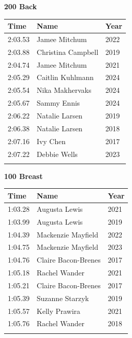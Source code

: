 \vspace{1.2em}
\noindent\begin{minipage}[t]{0.48\textwidth}
\centering
\textbf{\textcolor{teamprimary}{200 Back}}\par
\vspace{0.5em}
\centering
\small
\renewcommand{\arraystretch}{1.0}
\setlength{\tabcolsep}{4pt}
\begin{tabular}{@{}p{1.8cm}p{3.0cm}p{1.0cm}@{}}
\toprule
\textbf{Time} & \textbf{Name} & \textbf{Year} \\
\midrule
2:03.53 & Jamee Mitchum & 2022 \\
2:03.88 & Christina Campbell & 2019 \\
2:04.74 & Jamee Mitchum & 2021 \\
2:05.29 & Caitlin Kuhlmann & 2024 \\
2:05.54 & Nika Makhervaks & 2024 \\
2:05.67 & Sammy Ennis & 2024 \\
2:06.22 & Natalie Larsen & 2019 \\
2:06.38 & Natalie Larsen & 2018 \\
2:07.16 & Ivy Chen & 2017 \\
2:07.22 & Debbie Wells & 2023 \\
\bottomrule
\vspace{0.5em}
\end{tabular}
\end{minipage}
\hfill
\begin{minipage}[t]{0.48\textwidth}
\centering
\textbf{\textcolor{teamprimary}{100 Breast}}\par
\vspace{0.5em}
\centering
\small
\renewcommand{\arraystretch}{1.0}
\setlength{\tabcolsep}{4pt}
\begin{tabular}{@{}p{1.8cm}p{3.0cm}p{1.0cm}@{}}
\toprule
\textbf{Time} & \textbf{Name} & \textbf{Year} \\
\midrule
1:03.28 & Augusta Lewis & 2021 \\
1:03.99 & Augusta Lewis & 2019 \\
1:04.39 & Mackenzie Mayfield & 2022 \\
1:04.75 & Mackenzie Mayfield & 2023 \\
1:04.76 & Claire Bacon-Brenes & 2017 \\
1:05.18 & Rachel Wander & 2021 \\
1:05.21 & Claire Bacon-Brenes & 2017 \\
1:05.39 & Suzanne Starzyk & 2019 \\
1:05.57 & Kelly Prawira & 2021 \\
1:05.76 & Rachel Wander & 2018 \\
\bottomrule
\vspace{0.5em}
\end{tabular}
\end{minipage}
